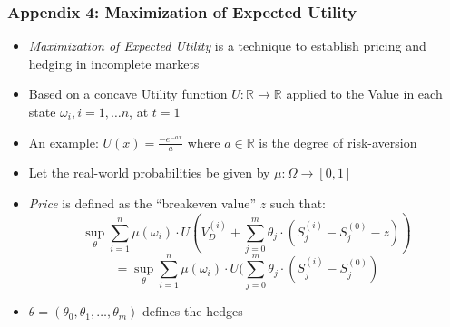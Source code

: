 \documentclass{beamer}
\begin{document}
\begin{frame}
\frametitle{Appendix 4: Maximization of Expected Utility}
\begin{itemize}
\item {\em Maximization of Expected Utility} is a technique to establish pricing and hedging in incomplete markets
\item Based on a concave Utility function $U : \mathbb{R} \rightarrow \mathbb{R}$ applied to the Value in each state $\omega_i, i = 1, \ldots n$, at $t=1$
\item An example: $U(x) = \frac {-e^{-ax}} {a}$ where $a \in \mathbb{R}$ is the degree of risk-aversion
\item Let the real-world probabilities be given by $\mu: \Omega \rightarrow [0,1]$
\item {\em Price} is defined as the ``breakeven value'' $z$ such that:
$$\sup_{\theta} \sum_{i=1}^n \mu(\omega_i) \cdot U(V_D^{(i)} + \sum_{j=0}^m \theta_j \cdot (S_j^{(i)} - S_j^{(0)} - z))$$
$$ = \sup_{\theta} \sum_{i=1}^n \mu(\omega_i) \cdot U(\sum_{j=0}^m \theta_j \cdot (S_j^{(i)} - S_j^{(0)})$$
\item $\theta = (\theta_0, \theta_1, \ldots, \theta_m)$ defines the hedges
\end{itemize}
\end{frame}
\end{document}
